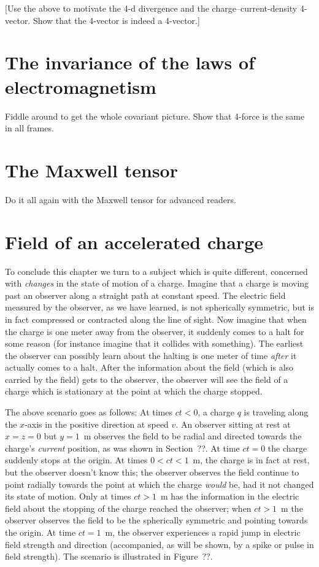 [Use the above to motivate the 4-d divergence and the
charge--current-density 4-vector.  Show that the 4-vector is indeed a
4-vector.]


\section{The invariance of the laws of electromagnetism}

Fiddle around to get the whole covariant picture.  Show that 4-force
is the same in all frames.


\section{The Maxwell tensor}

Do it all again with the Maxwell tensor for advanced readers.


\section{Field of an accelerated charge}

To conclude this chapter we turn to a subject which is quite
different, concerned with {\em changes\/} in the state of motion of a
charge.  Imagine that a charge is moving past an observer along a
straight path at constant speed.  The electric field measured by the
observer, as we have learned, is not spherically symmetric, but is in
fact compressed or contracted along the line of sight.  Now imagine
that when the charge is one meter away from the observer, it suddenly
comes to a halt for some reason (for instance imagine that it collides
with something).  The earliest the observer can possibly learn about
the halting is one meter of time {\em after\/} it actually comes to a
halt.  After the information about the field (which is also carried by
the field) gets to the observer, the observer will see the field of a
charge which is stationary at the point at which the charge stopped.

The above scenario goes as follows: At times $ct<0$, a charge $q$ is
traveling along the $x$-axis in the positive direction at speed $v$.
An observer sitting at rest at $x=z=0$ but $y=1$~m observes the field
to be radial and directed towards the charge's {\em current\/}
position, as was shown in Section~??.  At time $ct=0$ the charge
suddenly stops at the origin.  At times $0<ct<1$~m, the charge is in
fact at rest, but the observer doesn't know this; the observer
observes the field continue to point radially towards the point at
which the charge {\em would\/} be, had it not changed its state of
motion.  Only at times $ct>1$~m has the information in the electric
field about the stopping of the charge reached the observer; when
$ct>1$~m the observer observes the field to be the spherically
symmetric and pointing towards the origin.  At time $ct=1$~m, the
observer experiences a rapid jump in electric field strength and
direction (accompanied, as will be shown, by a spike or pulse in field
strength).  The scenario is illustrated in Figure~??.

